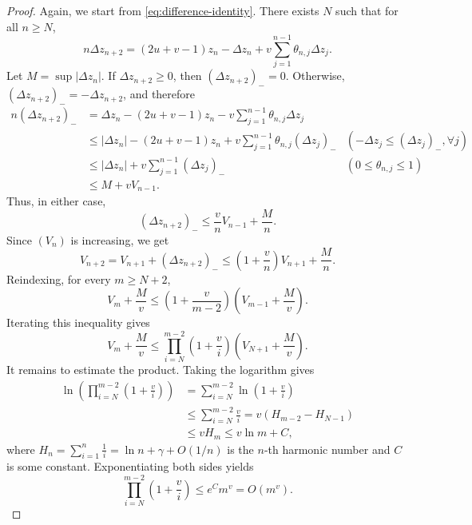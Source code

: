 \begin{proof}
  Again, we start from \eqref{eq:difference-identity}. There exists $N$ such that for all $n\ge N$,
  $$n\Delta z_{n+2} = (2u+v-1)z_n - \Delta z_n + v\sum_{j=1}^{n-1}\theta_{n,j}\Delta z_j.$$
  Let $M = \sup |\Delta z_n|$. 
  If $\Delta z_{n+2}\ge 0$, then $(\Delta z_{n+2})_- = 0$. Otherwise, $(\Delta z_{n+2})_- = -\Delta z_{n+2}$, and therefore
  \begin{align*}
    n(\Delta z_{n+2})_-
     & = \Delta z_n - (2u+v-1)z_n - v\sum_{j=1}^{n-1}\theta_{n,j}\Delta z_j                                                       \\
     & \le |\Delta z_n| - (2u+v-1)z_n + v\sum_{j=1}^{n-1}\theta_{n,j}(\Delta z_j)_- & (- \Delta z_j\le (\Delta z_j)_-, \forall j) \\
     & \le |\Delta z_n| + v\sum_{j=1}^{n-1}(\Delta z_j)_-                           & (0\le\theta_{n,j}\le1)                      \\
     & \le M + vV_{n-1}.
  \end{align*}
  Thus, in either case,
  $$(\Delta z_{n+2})_- \le \dfrac{v}{n}V_{n-1}+\dfrac{M}{n}.$$
  Since $(V_n)$ is increasing, we get
  \begin{equation}
    \label{eq:negative-variation-bound}
    V_{n+2}
    = V_{n+1}+(\Delta z_{n+2})_-
    \le \left(1+\dfrac{v}{n}\right)V_{n+1}+\dfrac{M}{n}.
  \end{equation}
  Reindexing, for every $m\ge N+2$,
  $$V_m + \dfrac{M}{v} \le \left(1+\dfrac{v}{m-2}\right)\left(V_{m-1} + \dfrac{M}{v}\right).$$
  Iterating this inequality gives
  $$V_m + \dfrac{M}{v}
    \le \prod_{i=N}^{m-2}\left(1+\dfrac{v}{i}\right)\left(V_{N+1} + \dfrac{M}{v}\right).$$
  It remains to estimate the product. Taking the logarithm gives
  \begin{align*}
    \ln\left(\prod_{i=N}^{m-2}\left(1+\frac{v}{i}\right) \right)
     & = \sum_{i=N}^{m-2}\ln\left(1+\frac{v}{i}\right)         \\
     & \le \sum_{i=N}^{m-2} \frac{v}{i} = v(H_{m-2} - H_{N-1}) \\
     & \le vH_m \le v\ln m + C,
  \end{align*}
  where $H_n=\sum_{i=1}^n \frac{1}{i} = \ln n + \gamma + O(1/n)$ is the $n$-th harmonic number and $C$ is some constant. Exponentiating both sides yields
  $$\prod_{i=N}^{m-2} \left( 1 + \frac{v}{i} \right) \le e^{C} m^v = O(m^v).$$
\end{proof}

